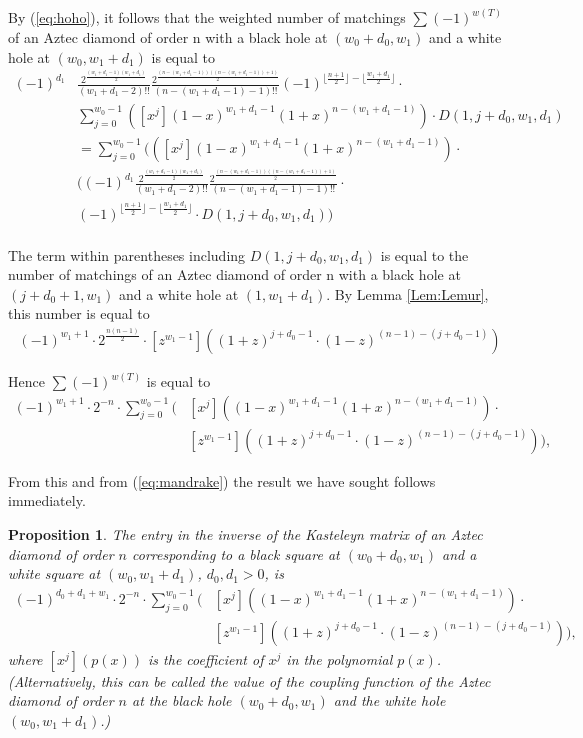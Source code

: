 \documentclass[10pt,reqno]{amsart}
\theoremstyle{plain}
\newtheorem{Prop}[Thm]{Proposition}
\theoremstyle{definition}
\theoremstyle{remark}
\begin{document}
By (\ref{eq:hoho}), it follows that 
the weighted number of matchings $\sum (-1)^{w(T)}$ of an Aztec diamond of
order n with a black hole at $(w_0+d_0,w_1)$ and a white hole at
$(w_0,w_1+d_1)$ is equal to 
\[
\label{eq:hra}
\begin{aligned}
(-1)^{d_1}
&\frac{2^{\frac{(w_1+d_1-1)(w_1+d_1)}{2}}}{(w_1+d_1-2)!!}
\frac{2^{\frac{(n-(w_1+d_1-1))((n-(w_1+d_1-1))+1)}{2}}}{(n-(w_1+d_1-1)-1)!!}
(-1)^{\lfloor \frac{n+1}{2} \rfloor - \lfloor \frac{w_1+d_1}{2} \rfloor}\cdot \\
&\sum_{j=0}^{w_0-1} ([x^j](1-x)^{w_1+d_1-1}(1+x)^{n-(w_1+d_1-1)})\cdot
		     D(1,j+d_0,w_1,d_1)\\
&= \sum_{j=0}^{w_0-1} (([x^j](1-x)^{w_1+d_1-1}(1+x)^{n-(w_1+d_1-1)})\cdot \\
&((-1)^{d_1}
\frac{2^{\frac{(w_1+d_1-1)(w_1+d_1)}{2}}}{(w_1+d_1-2)!!}
\frac{2^{\frac{(n-(w_1+d_1-1))((n-(w_1+d_1-1))+1)}{2}}}{(n-(w_1+d_1-1)-1)!!}\cdot \\
&(-1)^{\lfloor \frac{n+1}{2} \rfloor - \lfloor \frac{w_1+d_1}{2} \rfloor}
\cdot  D(1,j+d_0,w_1,d_1)) \\
\end{aligned}
\]

The term within parentheses including $D(1,j+d_0,w_1,d_1)$ is equal to
the number of matchings of an Aztec diamond of
order n with a black hole at $(j+d_0+1,w_1)$ and a white hole at
$(1,w_1+d_1)$. By Lemma \ref{Lem:Lemur}, this number is equal to
\[
\begin{aligned}\label{eq:hro}
(-1)^{w_1+1}\cdot 2^{\frac{n(n-1)}{2}}\cdot 
[z^{w_1-1}]((1+z)^{j+d_0-1} \cdot (1-z)^{(n-1)-(j+d_0-1)})
\end{aligned}
\]

Hence $\sum (-1)^{w(T)}$ is equal to
\[
\begin{aligned}
(-1)^{w_1+1}\cdot 2^{-n}\cdot 
\sum_{j=0}^{w_0-1}
(&[x^j]((1-x)^{w_1+d_1-1}(1+x)^{n-(w_1+d_1-1)})\cdot \\
&[z^{w_1-1}]((1+z)^{j+d_0-1} \cdot (1-z)^{(n-1)-(j+d_0-1)})),
\end{aligned}
\]

From this and from (\ref{eq:mandrake}) the result we have sought
follows immediately.

\begin{Prop}\label{prop:soup}
The entry in the inverse of the Kasteleyn matrix of an
Aztec diamond of order $n$ corresponding to a black square at $(w_0+d_0,w_1)$
and a white square at $(w_0,w_1+d_1)$, $d_0,d_1>0$, is
\begin{equation}
\begin{aligned}\label{eq:gp}
(-1)^{d_0+d_1+w_1}\cdot 2^{-n}\cdot 
\sum_{j=0}^{w_0-1}
(&[x^j]((1-x)^{w_1+d_1-1}(1+x)^{n-(w_1+d_1-1)})\cdot \\
&[z^{w_1-1}]((1+z)^{j+d_0-1} \cdot (1-z)^{(n-1)-(j+d_0-1)})),
\end{aligned}
\end{equation}
where $[x^j](p(x))$ is the coefficient of $x^j$ in the polynomial $p(x)$. 
(Alternatively, this can be called the value of the
coupling function of the Aztec
diamond of order $n$ at the black hole $(w_0+d_0,w_1)$ and the white
hole $(w_0,w_1+d_1)$.)
\end{Prop}
\end{document}
